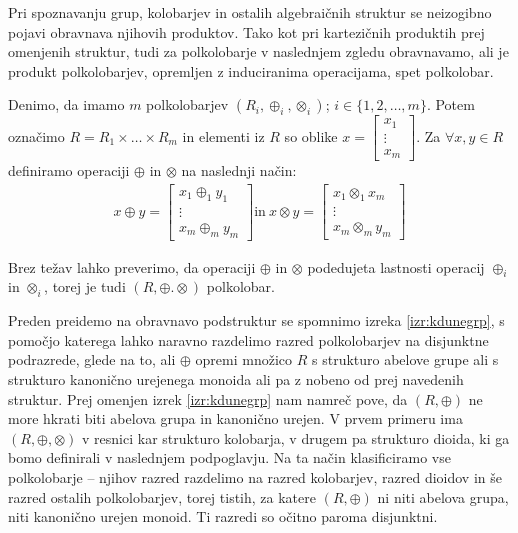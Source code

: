 \documentclass[mat1]{fmfdelo}
\begin{document}
Pri spoznavanju grup, kolobarjev in ostalih algebraičnih struktur se neizogibno pojavi obravnava njihovih produktov. Tako kot pri kartezičnih produktih prej omenjenih struktur, tudi za polkolobarje v naslednjem zgledu obravnavamo, ali je produkt polkolobarjev, opremljen z induciranima operacijama, spet polkolobar. 

\begin{zgled}
	\label{zgled:prodpolkolobar}
Denimo, da imamo $m$ polkolobarjev $(R_{i}, \oplus_{i}, \otimes_{i})$; $i\in \{1, 2, \ldots, m\}$. Potem označimo $R = R_1 \times \ldots \times R_m$ in elementi iz $R$ so oblike $x = \begin{bmatrix}
	x_1 \\
	\vdots \\
	x_m
\end{bmatrix}$. Za $\forall x, y\in R$ definiramo operaciji $\oplus$ in $\otimes$ na naslednji način:
\begin{align*}
	x \oplus y = \begin{bmatrix}
		x_1 \oplus_{1} y_1 \\
		\vdots \\
		x_m \oplus_{m} y_m
	\end{bmatrix} \text{in}~ x \otimes y = \begin{bmatrix}
		x_1 \otimes_{1} x_m \\
		\vdots \\
		x_m \otimes_{m} y_m
	\end{bmatrix}
\end{align*}

Brez težav lahko preverimo, da operaciji $\oplus$ in $\otimes$ podedujeta lastnosti operacij $\oplus_{i}$ in $\otimes_{i}$, torej je tudi $(R, \oplus. \otimes)$ polkolobar.
\end{zgled}

Preden preidemo na obravnavo podstruktur se spomnimo izreka \ref{izr:kdunegrp}, s pomočjo katerega lahko naravno razdelimo razred polkolobarjev na disjunktne podrazrede, glede na to, ali $\oplus$ opremi množico $R$ s strukturo abelove grupe ali s strukturo kanonično urejenega monoida ali pa z nobeno od prej navedenih struktur. Prej omenjen izrek \ref{izr:kdunegrp} nam namreč pove, da $(R, \oplus)$ ne more hkrati biti abelova grupa in kanonično urejen. V prvem primeru ima $(R, \oplus, \otimes)$ v resnici kar strukturo kolobarja, v drugem pa strukturo dioida, ki ga bomo definirali v naslednjem podpoglavju.
Na ta način klasificiramo vse polkolobarje -- njihov razred razdelimo na razred kolobarjev, razred dioidov in še razred ostalih polkolobarjev, torej tistih, za katere $(R, \oplus)$ ni niti abelova grupa, niti kanonično urejen monoid. Ti razredi so očitno paroma disjunktni.
\end{document}
